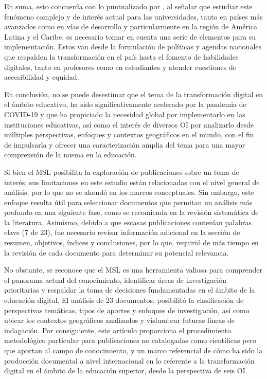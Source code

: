En suma, esto concuerda con lo puntualizado por \textcite{cerdá-suárez2021}, al señalar que estudiar este fenómeno complejo y
de interés actual para las universidades, tanto en países más avanzados
como en vías de desarrollo y particularmente en la región de América
Latina y el Caribe, es necesario tomar en cuenta una serie de elementos
para su implementación. Estos van desde la formulación de políticas y
agendas nacionales que respalden la transformación en el país hasta el
fomento de habilidades digitales, tanto en profesores como en
estudiantes y atender cuestiones de accesibilidad y equidad.

En conclusión, no se puede desestimar que el tema de la transformación
digital en el ámbito educativo, ha sido significativamente acelerado por
la pandemia de COVID-19 y que ha propiciado la necesidad global por
implementarlo en las instituciones educativas, así como el interés de
diversos OI por analizarlo desde múltiples perspectivas, enfoques y
contextos geográficos en el mundo, con el fin de impulsarla y ofrecer
una caracterización amplia del tema para una mayor comprensión de la
misma en la educación.

Si bien el MSL posibilita la exploración de publicaciones sobre un tema
de interés, sus limitaciones en este estudio están relacionadas con el
nivel general de análisis, por lo que no se ahondó en los marcos
conceptuales. Sin embargo, este enfoque resulta útil para seleccionar
documentos que permitan un análisis más profundo en una siguiente fase,
como se recomienda en la revisión sistemática de la literatura.
Asimismo, debido a que escasas publicaciones contenían palabras clave (7
de 23), fue necesario revisar información adicional en la sección de
resumen, objetivos, índices y conclusiones, por lo que, requirió de más
tiempo en la revisión de cada documento para determinar su potencial
relevancia.

No obstante, se reconoce que el MSL es una herramienta valiosa para
comprender el panorama actual del conocimiento, identificar áreas de
investigación prioritarias y respaldar la toma de decisiones
fundamentadas en el ámbito de la educación digital. El análisis de 23
documentos, posibilitó la clasificación de perspectivas temáticas, tipos
de aportes y enfoques de investigación, así como ubicar los contextos
geográficos analizados y vislumbrar futuras líneas de indagación. Por
consiguiente, este artículo proporciona el procedimiento metodológico
particular para publicaciones no catalogadas como científicas pero que
aportan al campo de conocimiento, y un marco referencial de cómo ha sido
la producción documental a nivel internacional en lo referente a la
transformación digital en el ámbito de la educación superior, desde la
perspectiva de seis OI.

